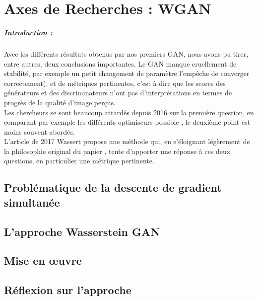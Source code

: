 

\chapter{Axes de Recherches : WGAN}

\paragraph*{Introduction : } Avec les différents résultats obtenus par nos premiers GAN, nous avons pu tirer, entre autres, deux conclusions importantes. Le GAN manque cruellement de stabilité, par exemple un petit changement de paramètre l'empêche de converger correctement), et de métriques pertinentes, c'est à dire que les scores des générateurs et des discriminateurs n'ont pas d'interprétations en termes de progrès de la qualité d'image perçus.\\
Les chercheurs se sont beaucoup attardés depuis 2016 sur la première question, en comparant par exemple les différents optimiseurs possible \cite{optimiser}, le deuxième point est moins souvent abordés. \\
L'article de 2017  Wassert\cite{wgan} propose une méthode qui, en s'éloignant légèrement de la philosophie original du papier \cite{Goodfellow-et-al-2016}, tente d'apporter une réponse à ces deux questions, en particulier une métrique pertinente.

\section{Problématique de la descente de gradient simultanée}

\section{L'approche Wasserstein GAN}

\section{Mise en œuvre}

\section{Réflexion sur l'approche}
